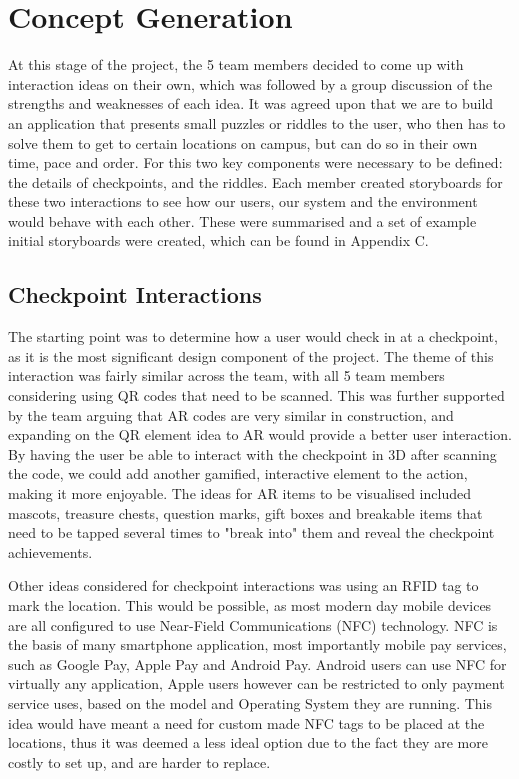 \documentclass[10pt,twocolumn]{article} %
\begin{document}
\section*{Concept Generation}
At this stage of the project, the 5 team members decided to come up with interaction ideas on their own, which was followed by a group discussion of the strengths and weaknesses of each idea.
It was agreed upon that we are to build an application that presents small puzzles or riddles to the user, who then has to solve them to get to certain locations on campus, but can do so in their own time, pace and order.
For this two key components were necessary to be defined: the details of checkpoints, and the riddles.
Each member created storyboards for these two interactions to see how our users, our system and the environment would behave with each other.
These were summarised and a set of example initial storyboards were created, which can be found in Appendix C.
\subsection*{Checkpoint Interactions}
The starting point was to determine how a user would check in at a checkpoint, as it is the most significant design component of the project. 
The theme of this interaction was fairly similar across the team, with all 5 team members considering using QR codes that need to be scanned. 
This was further supported by the team arguing that AR codes are very similar in construction, and expanding on the QR element idea to AR would provide a better user interaction. 
By having the user be able to interact with the checkpoint in 3D after scanning the code, we could add another gamified, interactive element to the action, making it more enjoyable. 
The ideas for AR items to be visualised included mascots, treasure chests, question marks, gift boxes and breakable items that need to be tapped several times to "break into" them and reveal the checkpoint achievements.

Other ideas considered for checkpoint interactions was using an RFID tag to mark the location. This would be possible, as most modern day mobile devices are all configured to use Near-Field Communications (NFC) technology. 
NFC is the basis of many smartphone application, most importantly mobile pay services, such as Google Pay, Apple Pay and Android Pay. Android users can use NFC for virtually any application, Apple users however can be restricted to only payment service uses, based on the model and Operating System they are running. 
This idea would have meant a need for custom made NFC tags to be placed at the locations, thus it was deemed a less ideal option due to the fact they are more costly to set up, and are harder to replace.
\end{document}
